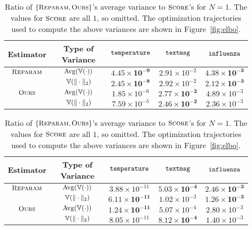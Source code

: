 {\def\arraystretch{1.4}
\begin{table}[t]
  \begin{subtable}{\textwidth}
    \center
    \begin{tabular}{cc|ccc}
      \hline
      Estimator & Type of Variance & $\mathtt{temperature}$ & $\mathtt{textmsg}$ & $\mathtt{influenza}$ \\
      \hline
      $\textsc{Reparam}$
      & $\mathrm{Avg}(\mathbb{V}(\cdot))$ & $\bm{4.45 \times 10^{-9}}$ & $2.91 \times 10^{-2}$ & $\bm{4.38 \times 10^{-3}}$ \\
      & $\mathbb{V}(\|\cdot\|_2)$ & $\bm{2.45 \times 10^{-8}}$ & $2.92 \times 10^{-2}$ & $\bm{2.12 \times 10^{-3}}$ \\
      \hline
      $\textsc{Ours}$
      & $\mathrm{Avg}(\mathbb{V}(\cdot))$ & $1.85 \times 10^{-6}$ & $\bm{2.77 \times 10^{-2}}$ & $4.89 \times 10^{-3}$ \\
      & $\mathbb{V}(\|\cdot\|_2)$ & $7.59 \times 10^{-5}$ & $\bm{2.46 \times 10^{-2}}$ & $2.36 \times 10^{-3}$ \\ \hline
    \end{tabular}
    \caption{$\text{stepsize}=0.001$}
  \end{subtable}

  \begin{subtable}{\textwidth}
    \center
    \begin{tabular}{cc|ccc}
      \hline
      Estimator & Type of Variance & $\mathtt{temperature}$ & $\mathtt{textmsg}$ & $\mathtt{influenza}$ \\
      \hline
      $\textsc{Reparam}$
      & $\mathrm{Avg}(\mathbb{V}(\cdot))$ & $3.88 \times 10^{-11}$ & $\bm{5.03 \times 10^{-4}}$ & $\bm{2.46 \times 10^{-3}}$ \\
      & $\mathbb{V}(\|\cdot\|_2)$ & $\bm{6.11 \times 10^{-11}}$ & $1.02 \times 10^{-3}$ & $\bm{1.26 \times 10^{-3}}$ \\
      \hline
      $\textsc{Ours}$
      & $\mathrm{Avg}(\mathbb{V}(\cdot))$ & $\bm{1.24 \times 10^{-11}}$ & $5.07 \times 10^{-4}$ & $2.80 \times 10^{-3}$ \\
      & $\mathbb{V}(\|\cdot\|_2)$ & $8.05 \times 10^{-11}$ & $\bm{8.12 \times 10^{-4}}$ & $1.40 \times 10^{-3}$ \\ \hline
    \end{tabular}
    \caption{$\text{stepsize}=0.01$}
  \end{subtable}

  \caption{
    Ratio of $\{\textsc{Reparam},\textsc{Ours}\}$'s average variance to $\textsc{Score}$'s 
    for $N=1$. %
    The values for $\textsc{Score}$ are all $1$, so omitted.
    The optimization trajectories used to compute the above variances
    are shown in Figure~\ref{fig:elbo}. %
  }
  \label{tab:variance}
\end{table}
}

